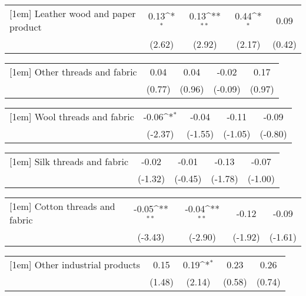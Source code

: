 {
\def\sym#1{\ifmmode^{#1}\else\(^{#1}\)\fi}
\begin{tabular}{l*{4}{c}}
[1em]
Leather wood and paper product&     0.13\sym{*}  &     0.13\sym{**} &     0.44\sym{*}  &     0.09         \\
                &   (2.62)         &   (2.92)         &   (2.17)         &   (0.42)         \\
\end{tabular}
}
{
\def\sym#1{\ifmmode^{#1}\else\(^{#1}\)\fi}
\begin{tabular}{l*{4}{c}}
[1em]
Other threads and fabric&     0.04         &     0.04         &    -0.02         &     0.17         \\
                &   (0.77)         &   (0.96)         &  (-0.09)         &   (0.97)         \\
\end{tabular}
}
{
\def\sym#1{\ifmmode^{#1}\else\(^{#1}\)\fi}
\begin{tabular}{l*{4}{c}}
[1em]
Wool threads and fabric&    -0.06\sym{*}  &    -0.04         &    -0.11         &    -0.09         \\
                &  (-2.37)         &  (-1.55)         &  (-1.05)         &  (-0.80)         \\
\end{tabular}
}
{
\def\sym#1{\ifmmode^{#1}\else\(^{#1}\)\fi}
\begin{tabular}{l*{4}{c}}
[1em]
Silk threads and fabric&    -0.02         &    -0.01         &    -0.13         &    -0.07         \\
                &  (-1.32)         &  (-0.45)         &  (-1.78)         &  (-1.00)         \\
\end{tabular}
}
{
\def\sym#1{\ifmmode^{#1}\else\(^{#1}\)\fi}
\begin{tabular}{l*{4}{c}}
[1em]
Cotton threads and fabric&    -0.05\sym{**} &    -0.04\sym{**} &    -0.12         &    -0.09         \\
                &  (-3.43)         &  (-2.90)         &  (-1.92)         &  (-1.61)         \\
\end{tabular}
}
{
\def\sym#1{\ifmmode^{#1}\else\(^{#1}\)\fi}
\begin{tabular}{l*{4}{c}}
[1em]
Other industrial products&     0.15         &     0.19\sym{*}  &     0.23         &     0.26         \\
                &   (1.48)         &   (2.14)         &   (0.58)         &   (0.74)         \\
\end{tabular}
}
